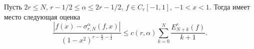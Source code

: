 \begin{theorem} Пусть $2r\le N$, $r-1/2\le \alpha\le 2r-1/2$, $f\in C_r[-1,1]$, $-1<x<1$. Тогда имеет место следующая оценка
\begin{equation}\label{5.25}
 \frac{|f(x)-\sigma_{r,N}^\alpha(f,x)|}
{(1-x^2)^{r-\frac{\alpha}{2}-\frac14}}\le c(r,\alpha)\sum_{k=0}^N\frac{E_{N+k}^r(f)}{k+1}.
 \end{equation}
\end{theorem}

%
